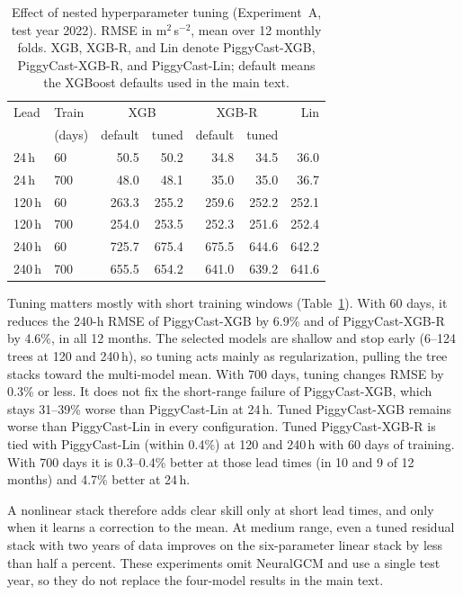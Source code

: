 \documentclass[twocol]{ametsocV6.1}
\newcommand{\units}{m$^{2}$\,s$^{-2}$}
\newcommand{\PCLin}{PiggyCast-Lin}
\newcommand{\PCXGB}{PiggyCast-XGB}
\newcommand{\PCXGBR}{PiggyCast-XGB-R}
\begin{document}
\begin{table}[H]
\caption{Effect of nested hyperparameter tuning (Experiment~A, test year 2022). RMSE in \units{}, mean over 12 monthly folds. XGB, XGB-R, and Lin denote \PCXGB{}, \PCXGBR{}, and \PCLin{}; default means the XGBoost defaults used in the main text.}\label{t:tuning}
\begin{center}
\footnotesize
\setlength{\tabcolsep}{4pt}
\begin{tabular}{llrrrrr}
\hline\hline
Lead & Train & \multicolumn{2}{c}{XGB} & \multicolumn{2}{c}{XGB-R} & Lin \\
 & (days) & default & tuned & default & tuned & \\
\hline
24\,h & 60 & 50.5 & 50.2 & 34.8 & 34.5 & 36.0 \\
24\,h & 700 & 48.0 & 48.1 & 35.0 & 35.0 & 36.7 \\
120\,h & 60 & 263.3 & 255.2 & 259.6 & 252.2 & 252.1 \\
120\,h & 700 & 254.0 & 253.5 & 252.3 & 251.6 & 252.4 \\
240\,h & 60 & 725.7 & 675.4 & 675.5 & 644.6 & 642.2 \\
240\,h & 700 & 655.5 & 654.2 & 641.0 & 639.2 & 641.6 \\
\hline
\end{tabular}
\end{center}
\end{table}



Tuning matters mostly with short training windows (Table~\ref{t:tuning}). With 60 days, it reduces the 240-h RMSE of \PCXGB{} by 6.9\% and of \PCXGBR{} by 4.6\%, in all 12 months. The selected models are shallow and stop early (6--124 trees at 120 and 240\,h), so tuning acts mainly as regularization, pulling the tree stacks toward the multi-model mean. With 700 days, tuning changes RMSE by 0.3\% or less. It does not fix the short-range failure of \PCXGB{}, which stays 31--39\% worse than \PCLin{} at 24\,h. Tuned \PCXGB{} remains worse than \PCLin{} in every configuration. Tuned \PCXGBR{} is tied with \PCLin{} (within 0.4\%) at 120 and 240\,h with 60 days of training. With 700 days it is 0.3--0.4\% better at those lead times (in 10 and 9 of 12 months) and 4.7\% better at 24\,h.

A nonlinear stack therefore adds clear skill only at short lead times, and only when it learns a correction to the mean. At medium range, even a tuned residual stack with two years of data improves on the six-parameter linear stack by less than half a percent. These experiments omit NeuralGCM and use a single test year, so they do not replace the four-model results in the main text.

\FloatBarrier


\end{document}
